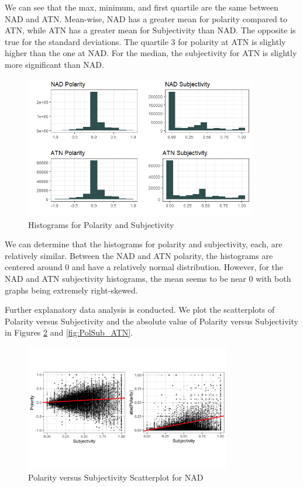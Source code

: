 \documentclass[12pt]{article}
\begin{document}
We can see that the max, minimum, and first quartile are the same between NAD and ATN. Mean-wise, NAD has a greater mean for polarity compared to ATN, while ATN has a greater mean for Subjectivity than NAD. The opposite is true for the standard deviations. The quartile 3 for polarity at ATN is slightly higher than the one at NAD. For the median, the subjectivity for ATN is slightly more significant than NAD.

\begin{figure}[H]
    \centering
    \includegraphics[width=0.9\textwidth]{images/PS_histos.png}
    \caption{Histograms for Polarity and Subjectivity}
    \label{fig:PS_histos}
\end{figure}

We can determine that the histograms for polarity and subjectivity, each, are relatively similar. Between the NAD and ATN polarity, the histograms are centered around 0 and have a relatively normal distribution. However, for the NAD and ATN subjectivity histograms, the mean seems to be near 0 with both graphs being extremely right-skewed.

Further explanatory data analysis is conducted. We plot the scatterplots of Polarity versus Subjectivity and the absolute value of Polarity versus Subjectivity in Figures \ref{fig:PolSub_NAD} and \ref{fig:PolSub_ATN}.

\begin{figure}[H]
    \centering
    \includegraphics[width=0.8\textwidth]{images/PolSub_NAD.png}
    \caption{Polarity versus Subjectivity Scatterplot for NAD}
    \label{fig:PolSub_NAD}
\end{figure}
\end{document}
